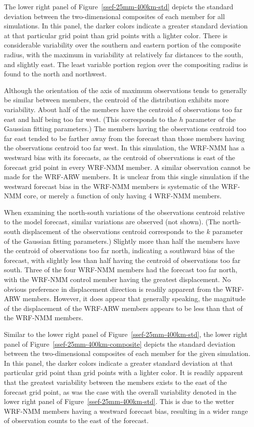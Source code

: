 The lower right panel of \mbox{Figure \ref{ssef-25mm-400km-std}} depicts the standard deviation between the two-dimensional composites of each member for all simulations.
In this panel, the darker colors indicate a greater standard deviation at that particular grid point than grid points with a lighter color.
There is considerable variability over the southern and eastern portion of the composite radius, with the maximum in variability at relatively far distances to the south, and slightly east.
The least variable portion region over the compositing radius is found to the north and northwest.


Although the orientation of the axis of maximum observations tends to generally be similar between members, the centroid of the distribution exhibits more variability.
About half of the members have the centroid of observations too far east and half being too far west.
(This corresponds to the $h$ parameter of the Gaussian fitting parameters.)
The members having the observations centroid too far east tended to be farther away from the forecast than those members having the observations centroid too far west.
In this simulation, the WRF-NMM has a westward bias with its forecasts, as the centroid of observations is east of the forecast grid point in every WRF-NMM member.
A similar observation cannot be made for the WRF-ARW members.
It is unclear from this single simulation if the westward forecast bias in the WRF-NMM members is systematic of the WRF-NMM core, or merely a function of only having 4 WRF-NMM members.


When examining the north-south variations of the observations centroid relative to the model forecast, similar variations are observed (not shown).
(The north-south displacement of the observations centroid corresponds to the $k$ parameter of the Gaussian fitting parameters.)
Slightly more than half the members have the centroid of observations too far north, indicating a southward bias of the forecast, with slightly less than half having the centroid of observations too far south.
Three of the four WRF-NMM members had the forecast too far north, with the WRF-NMM control member having the greatest displacement.
No obvious preference in displacement direction is readily apparent from the WRF-ARW members.
However, it does appear that generally speaking, the magnitude of the displacement of the WRF-ARW members appears to be less than that of the WRF-NMM members.


Similar to the lower right panel of \mbox{Figure \ref{ssef-25mm-400km-std}}, the lower right panel of \mbox{Figure \ref{ssef-25mm-400km-composite}} depicts the standard deviation between the two-dimensional composites of each member for the given simulation.
In this panel, the darker colors indicate a greater standard deviation at that particular grid point than grid points with a lighter color.
It is readily apparent that the greatest variability between the members exists to the east of the forecast grid point, as was the case with the overall variability denoted in the lower right panel of \mbox{Figure \ref{ssef-25mm-400km-std}}.
This is due to the wetter WRF-NMM members having a westward forecast bias, resulting in a wider range of observation counts to the east of the forecast.



